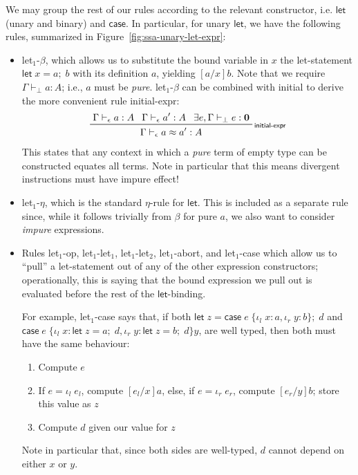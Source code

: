 \documentclass[acmsmall,screen,review]{acmart}
\newcommand{\mb}[1]{\ensuremath{\mathbf{#1}}}
\newcommand{\ms}[1]{\ensuremath{\mathsf{#1}}}
\newcommand{\lto}{:}
\newcommand{\linl}[1]{\iota_l\;{#1}}
\newcommand{\linr}[1]{\iota_r\;{#1}}
\newcommand{\letexpr}[3]{\ensuremath{\ms{let}\;#1 = #2;\;#3}}
\newcommand{\caseexpr}[5]{\ms{case}\;#1\;\{\linl{#2} \lto #3, \linr{#4} \lto #5\}}
\newcommand{\rle}[1]{{\scriptsize\textsf{#1}}}
\newcommand{\hasty}[4]{#1 \vdash_{#2} #3: {#4}}
\newcommand{\teqv}{\approx}
\newcommand{\tmeq}[5]{#1 \vdash_{#2} #3 \teqv #4 : {#5}}
\newcommand{\brle}[1]{{\textsf{#1}}}
\begin{document}
We may group the rest of our rules according to the relevant constructor, i.e. $\ms{let}$ (unary and
binary) and $\ms{case}$. In particular, for unary $\ms{let}$, we have the following rules,
summarized in Figure~\ref{fig:ssa-unary-let-expr}:
\begin{itemize}
  \item \brle{let$_1$-$\beta$}, which allows us to substitute the bound variable in $x$ the
  let-statement $\letexpr{x}{a}{b}$ with its definition $a$, yielding $[a/x]b$. Note that we require
  $\hasty{\Gamma}{\bot}{a}{A}$; i.e., $a$ must be \emph{pure}.
  \brle{let$_1$-$\beta$} can be combined with \brle{initial} to derive the more convenient
  rule \brle{initial-expr}:
  \begin{gather*}
    \prftree[r]{\rle{initial-expr}} 
      {\hasty{\Gamma}{\epsilon}{a}{A}}
      {\hasty{\Gamma}{\epsilon}{a'}{A}}
      {\exists e, \hasty{\Gamma}{\bot}{e}{\mb{0}}}
      {\tmeq{\Gamma}{\epsilon}{a}{a'}{A}}
  \end{gather*}
  This states that any context in which a \emph{pure} term of empty type can be constructed equates
  all terms. Note in particular that this means divergent instructions must have impure effect!

  \item \brle{let$_1$-$\eta$}, which is the standard $\eta$-rule for \ms{let}. This is included as a
  separate rule since, while it follows trivially from $\beta$ for pure $a$, we also want to
  consider \emph{impure} expressions.
  
  \item Rules \brle{let$_1$-op}, \brle{let$_1$-let$_1$}, \brle{let$_1$-let$_2$},
  \brle{let$_1$-abort}, and \brle{let$_1$-case} which allow us to ``pull'' a let-statement out of
  any of the other expression constructors; operationally, this is saying that the bound expression
  we pull out is evaluated before the rest of the \ms{let}-binding.
  
  For example, \brle{let$_1$-case} says that, if both
  $\letexpr{z}{\caseexpr{e}{x}{a}{y}{b}}{d}$ and
  $\caseexpr{e}{x}{\letexpr{z}{a}{d}}{y}{\letexpr{z}{b}{d}}{y}$,
  are well typed, then both must have the same behaviour:
  \begin{enumerate}
    \item Compute $e$
    \item If $e = \linl{e_l}$, compute $[e_l/x]a$, else, if $e = \linr{e_r}$, compute $[e_r/y]b$;
          store this value as $z$
    \item Compute $d$ given our value for $z$
  \end{enumerate}
  Note in particular that, since both sides are well-typed, $d$ cannot depend on either $x$ or $y$.
\end{itemize}
\end{document}
